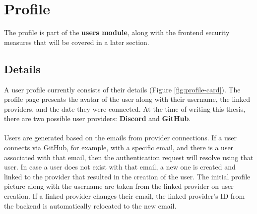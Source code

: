 \section{Profile}

The profile is part of the \textbf{users module}, along with the frontend security measures that will be covered in a later section.

\subsection{Details}

\noindent A user profile currently consists of their details (Figure \ref{fig:profile-card}). The profile page presents the avatar of the user along with their username, the linked providers, and the date they were connected. At the time of writing this thesis, there are two possible user providers: \textbf{Discord} and \textbf{GitHub}.
\\\\
\noindent Users are generated based on the emails from provider connections. If a user connects via GitHub, for example, with a specific email, and there is a user associated with that email, then the authentication request will resolve using that user. In case a user does not exist with that email, a new one is created and linked to the provider that resulted in the creation of the user. The initial profile picture along with the username are taken from the linked provider on user creation. If a linked provider changes their email, the linked provider's ID from the backend is automatically relocated to the new email.

